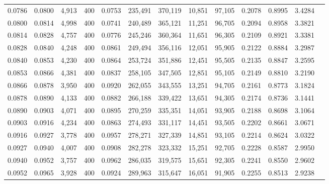 \begin{tabular}{rrrrrrrrrrrrr}
0.0786 & 0.0800 &  4,913 & 400 &                                     0.0753 & 235,491 & 370,119 &  10,851 &  97,105 & 0.2078 & 0.8995 & 3.4284 \\
0.0800 & 0.0814 &  4,998 & 400 &                                     0.0741 & 240,489 & 365,121 &  11,251 &  96,705 & 0.2094 & 0.8958 & 3.3821 \\
0.0814 & 0.0828 &  4,757 & 400 &                                     0.0776 & 245,246 & 360,364 &  11,651 &  96,305 & 0.2109 & 0.8921 & 3.3381 \\
0.0828 & 0.0840 &  4,248 & 400 &                                     0.0861 & 249,494 & 356,116 &  12,051 &  95,905 & 0.2122 & 0.8884 & 3.2987 \\
0.0840 & 0.0853 &  4,230 & 400 &                                     0.0864 & 253,724 & 351,886 &  12,451 &  95,505 & 0.2135 & 0.8847 & 3.2595 \\
0.0853 & 0.0866 &  4,381 & 400 &                                     0.0837 & 258,105 & 347,505 &  12,851 &  95,105 & 0.2149 & 0.8810 & 3.2190 \\
0.0866 & 0.0878 &  3,950 & 400 &                                     0.0920 & 262,055 & 343,555 &  13,251 &  94,705 & 0.2161 & 0.8773 & 3.1824 \\
0.0878 & 0.0890 &  4,133 & 400 &                                     0.0882 & 266,188 & 339,422 &  13,651 &  94,305 & 0.2174 & 0.8736 & 3.1441 \\
0.0890 & 0.0903 &  4,071 & 400 &                                     0.0895 & 270,259 & 335,351 &  14,051 &  93,905 & 0.2188 & 0.8698 & 3.1064 \\
0.0903 & 0.0916 &  4,234 & 400 &                                     0.0863 & 274,493 & 331,117 &  14,451 &  93,505 & 0.2202 & 0.8661 & 3.0671 \\
0.0916 & 0.0927 &  3,778 & 400 &                                     0.0957 & 278,271 & 327,339 &  14,851 &  93,105 & 0.2214 & 0.8624 & 3.0322 \\
0.0927 & 0.0940 &  4,007 & 400 &                                     0.0908 & 282,278 & 323,332 &  15,251 &  92,705 & 0.2228 & 0.8587 & 2.9950 \\
0.0940 & 0.0952 &  3,757 & 400 &                                     0.0962 & 286,035 & 319,575 &  15,651 &  92,305 & 0.2241 & 0.8550 & 2.9602 \\
0.0952 & 0.0965 &  3,928 & 400 &                                     0.0924 & 289,963 & 315,647 &  16,051 &  91,905 & 0.2255 & 0.8513 & 2.9238 \\

\end{tabular}
